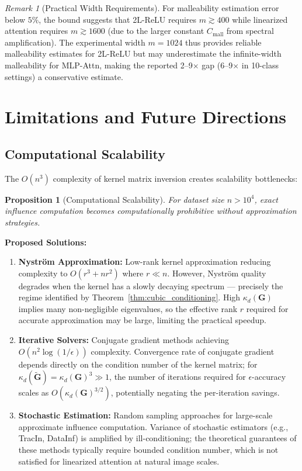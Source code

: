 \documentclass{article}
\theoremstyle{plain}
\newtheorem{proposition}[theorem]{Proposition}
\theoremstyle{definition}
\theoremstyle{remark}
\newtheorem{remark}[theorem]{Remark}
\begin{document}
\begin{remark}[Practical Width Requirements]
For malleability estimation error below $5\%$, the bound suggests that 2L-ReLU requires $m \gtrsim 400$ while linearized attention requires $m \gtrsim 1600$ (due to the larger constant $C_{\text{mall}}$ from spectral amplification). The experimental width $m = 1024$ thus provides reliable malleability estimates for 2L-ReLU but may underestimate the infinite-width malleability for MLP-Attn, making the reported 2--9$\times$ gap (6--9$\times$ in 10-class settings) a conservative estimate.
\end{remark}

\section{Limitations and Future Directions}
\label{app:limitations}

\subsection{Computational Scalability}

The $O(n^3)$ complexity of kernel matrix inversion creates scalability bottlenecks:

\begin{proposition}[Computational Scalability]
For dataset size $n > 10^4$, exact influence computation becomes computationally prohibitive without approximation strategies.
\end{proposition}

\textbf{Proposed Solutions:}
\begin{enumerate}
\item \textbf{Nystr\"om Approximation:} Low-rank kernel approximation reducing complexity to $O(r^3 + nr^2)$ where $r \ll n$. However, Nystr\"om quality degrades when the kernel has a slowly decaying spectrum --- precisely the regime identified by Theorem~\ref{thm:cubic_conditioning}. High $\kappa_d(\mathbf{G})$ implies many non-negligible eigenvalues, so the effective rank $r$ required for accurate approximation may be large, limiting the practical speedup.
\item \textbf{Iterative Solvers:} Conjugate gradient methods achieving $O(n^2 \log(1/\epsilon))$ complexity. Convergence rate of conjugate gradient depends directly on the condition number of the kernel matrix; for $\kappa_d(\tilde{\mathbf{G}}) = \kappa_d(\mathbf{G})^3 \gg 1$, the number of iterations required for $\epsilon$-accuracy scales as $O(\kappa_d(\mathbf{G})^{3/2})$, potentially negating the per-iteration savings.
\item \textbf{Stochastic Estimation:} Random sampling approaches for large-scale approximate influence computation. Variance of stochastic estimators (e.g., TracIn, DataInf) is amplified by ill-conditioning; the theoretical guarantees of these methods typically require bounded condition number, which is not satisfied for linearized attention at natural image scales.
\end{enumerate}
\end{document}
